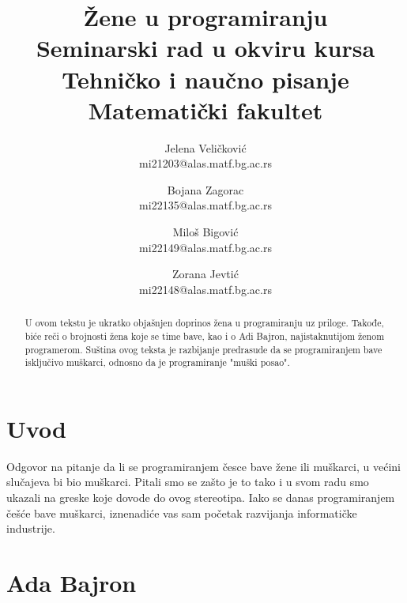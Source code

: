 \documentclass[a4paper,12pt]{article}
\begin{document}
\title{\textbf{Žene u programiranju\\} \small{Seminarski rad u okviru kursa\\Tehničko i naučno pisanje\\ Matematički fakultet}}

\author{Jelena Veličković\\ mi21203@alas.matf.bg.ac.rs \and Bojana Zagorac\\ mi22135@alas.matf.bg.ac.rs \and Miloš Bigović\\ mi22149@alas.matf.bg.ac.rs \and Zorana Jevtić\\ mi22148@alas.matf.bg.ac.rs}

\date{\textit{}}

\maketitle

\begin{abstract}
    U ovom tekstu je ukratko objašnjen doprinos žena u programiranju uz priloge. Takođe, biće reči o
    brojnosti žena koje se time bave, kao i o Adi Bajron, najistaknutijom ženom programerom. Suština 
    ovog teksta je razbijanje predrasude da se programiranjem bave isključivo muškarci, odnosno da je 
    programiranje "muški posao". 
\end{abstract}


\color{blue}\tableofcontents

\newpage
\color{black}\section{Uvod}
\begin{flushleft}
Odgovor na pitanje da li se programiranjem česce bave žene ili muškarci, u većini slučajeva bi bio muškarci. Pitali smo se zašto je to tako i u svom radu smo ukazali na greske koje dovode do ovog stereotipa. 
Iako se danas programiranjem češće bave muškarci, iznenadiće vas sam početak razvijanja informatičke industrije.
\end{flushleft}

\newpage
\section{Ada Bajron}
\end{document}
